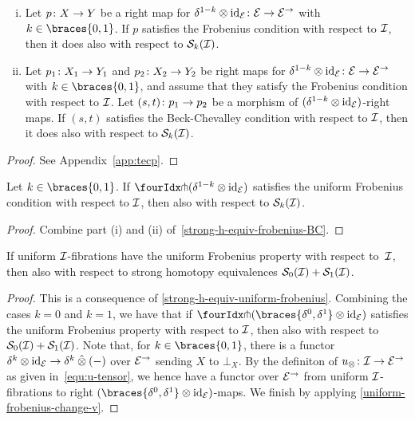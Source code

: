 \documentclass[reqno,10pt,a4paper,oneside,draft]{amsart}
\begin{document}
\begin{lemma} \label{strong-h-equiv-frobenius-BC}
\leavevmode
\begin{enumerate}[(i)]
\item Let $p \co X \to Y$ be a right map for $\kcylinv \otimes \id_{\calE} \co \catE \to \catE^\to$ with $k \in \braces{0, 1}$.
If $p$ satisfies the Frobenius condition with respect to $\cal{I}$, then it does also with respect to $\cal{S}_k(\cal{I})$.
\item Let $p_1 \co X_1 \to Y_1$ and $p_2 \co X_2 \to Y_2$ be right maps for $\kcylinv \otimes \id_{\calE} \co \catE \to \catE^\to$ with $k \in \braces{0, 1}$, and assume that they satisfy the Frobenius condition with respect to $\cal{I}$.
Let $(s, t) \co p_1 \to p_2$ be a morphism of $(\kcylinv \otimes \id_\catE)$-right maps.
If $(s, t)$ satisfies the Beck-Chevalley condition with respect to $\cal{I}$, then it does also with respect to $\cal{S}_k(\cal{I})$.
\end{enumerate}
\end{lemma}

\begin{proof}
See Appendix~\ref{app:tecp}.
\end{proof}

\begin{corollary} \label{strong-h-equiv-uniform-frobenius}
Let $k \in \braces{0, 1}$.
If $\liftr{(\kcylinv \otimes \id_\catE)}$ satisfies the uniform Frobenius condition with respect to $\cal{I}$, then also with respect to $\cal{S}_k(\cal{I})$.
\end{corollary}

\begin{proof}
Combine part (i) and (ii) of~\cref{strong-h-equiv-frobenius-BC}.
\end{proof}

\begin{proposition} \label{strong-h-equiv-uniform-frobenius-fibrations}
If uniform $\cal{I}$-fibrations have the uniform Frobenius property with respect to~$\cal{I}$, then also with respect to strong homotopy equivalences $\cal{S}_0(\cal{I}) + \cal{S}_1(\cal{I})$.
\end{proposition}

\begin{proof}
This is a consequence of \cref{strong-h-equiv-uniform-frobenius}.
Combining the cases $k = 0$ and $k = 1$, we have that if $\liftr{(\braces{\lcyl, \rcyl} \otimes \id_\catE)}$ satisfies the uniform Frobenius property with respect to $\cal{I}$, then also with respect to $\cal{S}_0(\cal{I}) + \cal{S}_1(\cal{I})$.
Note that, for $k \in \braces{0, 1}$, there is a functor $\delta^k \otimes \id_\catE \to \delta^k \hatotimes (-)$ over $\catE^\to$ sending $X$ to $\bot_X$.
By the definiton of $u_\otimes \co \cal{I} \to \catE^\to$ as given in~\eqref{equ:u-tensor}, we hence have a functor over $\catE^\to$ from uniform $\cal{I}$-fibrations to right $(\braces{\lcyl, \rcyl} \otimes \id_\catE)$-maps.
We finish by applying \cref{uniform-frobenius-change-v}.
\end{proof}
\end{document}
